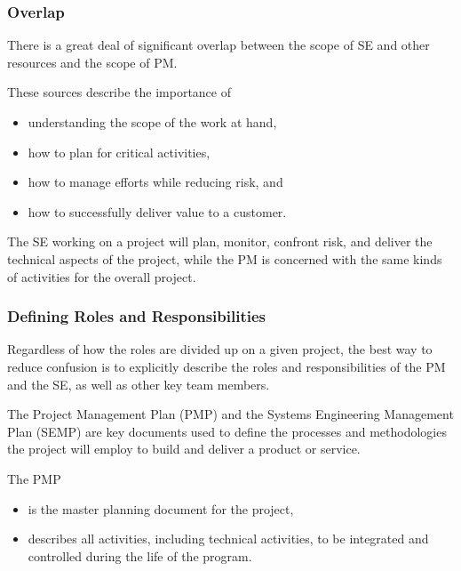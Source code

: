\documentclass[letterpaper,10pt,english]{jupyterBook}
\begin{document}
\subsubsection{Overlap}
\label{\detokenize{SE/sebok:overlap}}
\sphinxAtStartPar
There is a great deal of significant overlap between the scope of SE and other resources and the scope of PM.

\sphinxAtStartPar
These sources describe the importance of
\begin{itemize}
\item {} 
\sphinxAtStartPar
understanding the scope of the work at hand,

\item {} 
\sphinxAtStartPar
how to plan for critical activities,

\item {} 
\sphinxAtStartPar
how to manage efforts while reducing risk, and

\item {} 
\sphinxAtStartPar
how to successfully deliver value to a customer.

\end{itemize}

\sphinxAtStartPar
The SE working on a project will plan, monitor, confront risk, and deliver the technical aspects of the project, while the PM is concerned with the same kinds of activities for the overall project.


\subsubsection{Defining Roles and Responsibilities}
\label{\detokenize{SE/sebok:defining-roles-and-responsibilities}}
\sphinxAtStartPar
Regardless of how the roles are divided up on a given project, the best way to reduce confusion is to explicitly describe the roles and responsibilities of the PM and the SE, as well as other key team members.

\sphinxAtStartPar
The Project Management Plan (PMP) and the Systems Engineering Management Plan (SEMP) are key documents used to define the processes and methodologies the project will employ to build and deliver a product or
service.

\sphinxAtStartPar
The PMP
\begin{itemize}
\item {} 
\sphinxAtStartPar
is the master planning document for the project,

\item {} 
\sphinxAtStartPar
describes all activities, including technical activities, to be integrated and controlled during the life of the program.

\end{itemize}
\end{document}
